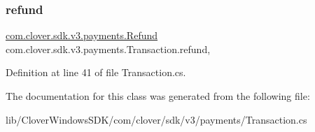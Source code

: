 \subsubsection{\texorpdfstring{refund}{refund}}
{\footnotesize\ttfamily \hyperlink{classcom_1_1clover_1_1sdk_1_1v3_1_1payments_1_1_refund}{com.\+clover.\+sdk.\+v3.\+payments.\+Refund} com.\+clover.\+sdk.\+v3.\+payments.\+Transaction.\+refund\hspace{0.3cm}{\ttfamily [get]}, {\ttfamily [set]}}



Definition at line 41 of file Transaction.\+cs.



The documentation for this class was generated from the following file\+:\begin{DoxyCompactItemize}
\item 
lib/\+Clover\+Windows\+S\+D\+K/com/clover/sdk/v3/payments/Transaction.\+cs\end{DoxyCompactItemize}
